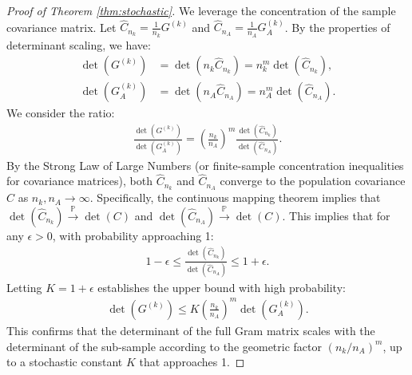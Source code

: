 \documentclass{article}
\theoremstyle{plain}
\theoremstyle{definition}
\theoremstyle{remark}
\begin{document}
\begin{proof}[Proof of Theorem \ref{thm:stochastic}]
We leverage the concentration of the sample covariance matrix. Let $\hat{C}_{n_k} = \frac{1}{n_k} G^{(k)}$ and $\hat{C}_{n_A} = \frac{1}{n_A} G^{(k)}_A$. By the properties of determinant scaling, we have:
\begin{align}
    \det(G^{(k)}) &= \det(n_k \hat{C}_{n_k}) = n_k^m \det(\hat{C}_{n_k}), \nonumber \\
    \det(G^{(k)}_A) &= \det(n_A \hat{C}_{n_A}) = n_A^m \det(\hat{C}_{n_A}).
\end{align}
We consider the ratio:
\begin{align}
    \frac{\det(G^{(k)})}{\det(G^{(k)}_A)} = \left( \frac{n_k}{n_A} \right)^m \frac{\det(\hat{C}_{n_k})}{\det(\hat{C}_{n_A})}.
\end{align}
By the Strong Law of Large Numbers (or finite-sample concentration inequalities for covariance matrices), both $\hat{C}_{n_k}$ and $\hat{C}_{n_A}$ converge to the population covariance $C$ as $n_k, n_A \to \infty$.
Specifically, the continuous mapping theorem implies that $\det(\hat{C}_{n_k}) \xrightarrow{\mathbb{P}} \det(C)$ and $\det(\hat{C}_{n_A}) \xrightarrow{\mathbb{P}} \det(C)$. This implies that for any $\epsilon > 0$, with probability approaching 1:
\begin{align}
    1 - \epsilon \le \frac{\det(\hat{C}_{n_k})}{\det(\hat{C}_{n_A})} \le 1 + \epsilon.
\end{align}
Letting $K = 1+\epsilon$ establishes the upper bound with high probability:
\begin{align}
    \det(G^{(k)}) \le K \left( \frac{n_k}{n_A} \right)^m \det(G^{(k)}_A).
\end{align}
This confirms that the determinant of the full Gram matrix scales with the determinant of the sub-sample according to the geometric factor $(n_k/n_A)^m$, up to a stochastic constant $K$ that approaches 1.
\end{proof}
\end{document}
